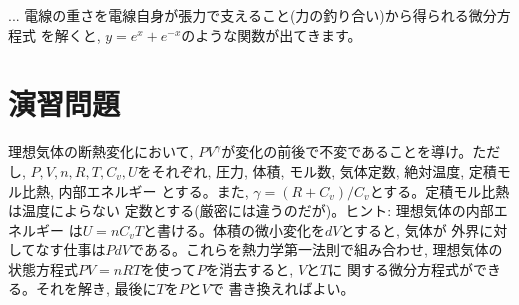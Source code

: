 \begin{faq}{\small{}
... 電線の重さを電線自身が張力で支えること(力の釣り合い)から得られる微分方程式
を解くと, $y=e^x+e^{-x}$のような関数が出てきます。}\end{faq}


\section*{演習問題}

\begin{exq}\label{q:adiabatic_process} 理想気体の断熱変化において, 
$PV^{\gamma}$が変化の前後で不変であることを導け。ただし, $P, V, n, R, T, C_v, U$をそれぞれ, 
圧力, 体積, モル数, 気体定数, 絶対温度, 定積モル比熱, 内部エネルギー
とする。また, $\gamma=(R+C_v)/C_v$とする。定積モル比熱は温度によらない
定数とする(厳密には違うのだが)。ヒント: 理想気体の内部エネルギー
は$U=nC_v T$と書ける。体積の微小変化を$dV$とすると, 気体が
外界に対してなす仕事は$PdV$である。これらを熱力学第一法則で組み合わせ, 
理想気体の状態方程式$PV=nRT$を使って$P$を消去すると, $V$と$T$に
関する微分方程式ができる。それを解き, 最後に$T$を$P$と$V$で
書き換えればよい。\end{exq}\mv


